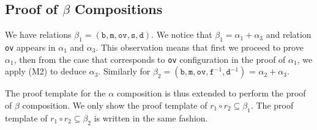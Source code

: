 \documentclass{llncs}
\begin{document}
\subsection{Proof of $\beta$ Compositions}
\label{sect:beta}

We have relations $\beta_1 = (\texttt{b}, \texttt{m}, \texttt{ov}, \texttt{s}, \texttt{d})$. We notice that $\beta_1 = \alpha_1 + \alpha_3$  and relation \texttt{ov} appears in $\alpha_1$ and $\alpha_3$.  This observation means that first we proceed to prove $\alpha_1$, then from the case that corresponds to \texttt{ov} configuration in the proof of $\alpha_1$, we   apply (M2) to deduce $\alpha_3$. Similarly for  $\beta_2 = (\texttt{b}, \texttt{m}, \texttt{ov}, \texttt{f}^{-1}, \texttt{d}^{-1})$ = $\alpha_2 + \alpha_3$. %

The proof template for the $\alpha$ composition is thus extended to perform the proof of $\beta$ composition. We only show  the proof template of $r_1 \circ r_2 \subseteq \beta_1$. The proof template of $r_1 \circ r_2 \subseteq \beta_2$ is written in the same fashion.
\end{document}
